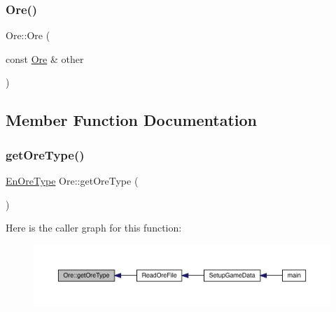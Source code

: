 \mbox{\label{class_ore_a06914cddcedb828081b0183a46db6ac5}} 
\subsubsection{\texorpdfstring{Ore()}{Ore()}\hspace{0.1cm}{\footnotesize\ttfamily [2/2]}}
{\footnotesize\ttfamily Ore\+::\+Ore (\begin{DoxyParamCaption}\item[{const \mbox{\hyperlink{class_ore}{Ore}} \&}]{other }\end{DoxyParamCaption})}



\subsection{Member Function Documentation}
\mbox{\label{class_ore_a77e26bca7317ab83d19dbf8695bcebb6}} 
\subsubsection{\texorpdfstring{get\+Ore\+Type()}{getOreType()}}
{\footnotesize\ttfamily \mbox{\hyperlink{_ore_8hpp_a4dd6f8b19eecee73049dd69be5803f14}{En\+Ore\+Type}} Ore\+::get\+Ore\+Type (\begin{DoxyParamCaption}{ }\end{DoxyParamCaption})}

Here is the caller graph for this function\+:
\nopagebreak
\begin{figure}[H]
\begin{center}
\leavevmode
\includegraphics[width=350pt]{d7/d51/class_ore_a77e26bca7317ab83d19dbf8695bcebb6_icgraph}
\end{center}
\end{figure}
\mbox{\label{class_ore_ac00c9de7ec899518c864199a18b52eac}} 
